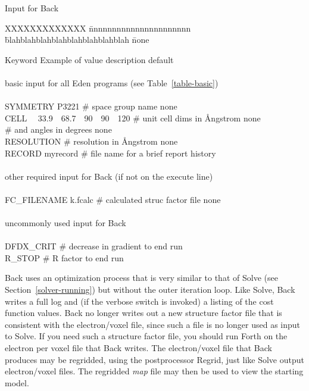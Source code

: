 \documentclass{report}
\begin{document}
{\begin{table}[htb]
\caption {\large Input for Back}
\label{table-back}

\begin{tabbing}
XXXXXXXXXXXXX \= nnnnnnnnnnnnnnnnnnnnnn \= 
blahblahblahblahblahblahblahblah \= none \kill

Keyword \> Example of value \> description \> default \\
\\
\> basic input for all Eden programs (see Table~\ref{table-basic}) \> \\
\\
SYMMETRY \> P3221 \> \# space group name \>  none \\
CELL ~~33.9~~68.7~~90~~90~~120 \> \# unit cell dims in \AA ngstrom \> none \\
\> \> \# and angles in degrees \> none \\
RESOLUTION  \> \# resolution in \AA ngstrom \> none \\
RECORD \> myrecord \> \# file name for a brief report \> history \\
\\
\> other required input for Back (if not on the execute line)  \> \\
\\
FC\_FILENAME \> k.fcalc \> \# calculated struc factor file \> none \\
\\
\> uncommonly used input for Back  \> \\
\\
DFDX\_CRIT  \> \# decrease in gradient to end run
 \\
R\_STOP    \> \# R factor to end run  \\ 

\end{tabbing} 
\end{table}

\vspace {0.1in}

Back uses an optimization process that is very similar to that of 
Solve
(see Section~\ref{solver-running}) but without the outer iteration loop.
Like Solve, Back writes a full log and (if the verbose switch 
is invoked) a
listing of the cost function values.  Back no longer writes out a new structure
factor file that is consistent with the electron/voxel file, since such a file
is no longer used as input to Solve.  If you need such a structure factor file,
you should run Forth on the electron per voxel file that Back 
writes.  The electron/voxel file that 
Back produces may be regridded, using the postprocessor Regrid, 
just like Solve output electron/voxel files.  The regridded
{\it map} file may then be used to view the starting model.
   
}
\end{document}
